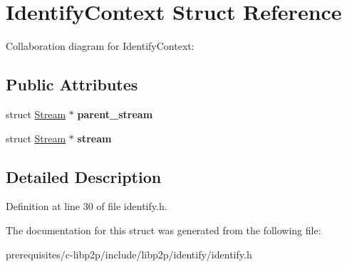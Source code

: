 \hypertarget{struct_identify_context}{}\section{Identify\+Context Struct Reference}
\label{struct_identify_context}


Collaboration diagram for Identify\+Context\+:
\subsection*{Public Attributes}
\begin{DoxyCompactItemize}
\item 
\mbox{\label{struct_identify_context_a3a93c0d031735a8ca4bb95a69d13cff4}} 
struct \mbox{\hyperlink{struct_stream}{Stream}} $\ast$ {\bfseries parent\+\_\+stream}
\item 
\mbox{\label{struct_identify_context_a56b239bc67bebf56d53a210acabf6d71}} 
struct \mbox{\hyperlink{struct_stream}{Stream}} $\ast$ {\bfseries stream}
\end{DoxyCompactItemize}


\subsection{Detailed Description}


Definition at line 30 of file identify.\+h.



The documentation for this struct was generated from the following file\+:\begin{DoxyCompactItemize}
\item 
prerequisites/c-\/libp2p/include/libp2p/identify/identify.\+h\end{DoxyCompactItemize}
